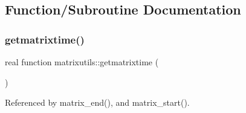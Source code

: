 \subsection{Function/\+Subroutine Documentation}
\mbox{\label{namespacematrixutils_a969773017c47f3dc8dfb2a18e5bc5fbd}} 
\subsubsection{\texorpdfstring{getmatrixtime()}{getmatrixtime()}}
{\footnotesize\ttfamily real function matrixutils\+::getmatrixtime (\begin{DoxyParamCaption}{ }\end{DoxyParamCaption})}



Referenced by matrix\+\_\+end(), and matrix\+\_\+start().

